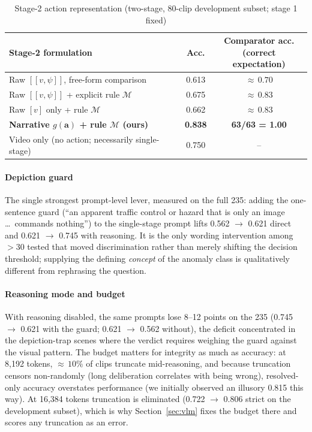 \documentclass[conference]{IEEEtran}
\newcommand{\act}{\boldsymbol{a}}          %
\newcommand{\Mcal}{\mathcal{M}}            %
\begin{document}
\begin{table}[htbp]
\caption{Stage-2 action representation (two-stage, 80-clip development subset; stage 1 fixed)}
\begin{center}
\footnotesize
\begin{tabular}{|p{3.05cm}|c|c|}
\hline
\textbf{Stage-2 formulation} & \textbf{Acc.} & \parbox[c]{3.05cm}{\centering\textbf{Comparator acc.}\\\textbf{(correct expectation)}\vspace{1pt}} \\
\hline
Raw $[[v, \psi]]$, free-form comparison & 0.613 & ${\approx}\,0.70$ \\
\hline
Raw $[[v, \psi]]$ + explicit rule $\Mcal$ & 0.675 & ${\approx}\,0.83$ \\
\hline
Raw $[v]$ only + rule $\Mcal$ & 0.662 & ${\approx}\,0.83$ \\
\hline
\textbf{Narrative $g(\act)$ + rule $\Mcal$ (ours)} & \textbf{0.838} & \textbf{63/63 = 1.00} \\
\hline
Video only (no action; necessarily single-stage) & 0.750 & -- \\
\hline
\end{tabular}
\label{tab:action}
\end{center}
\end{table}

\paragraph{Depiction guard} The single strongest prompt-level lever, measured on the full 235: adding the one-sentence guard (``an apparent traffic control or hazard that is only an image \dots\ commands nothing'') to the single-stage prompt lifts 0.562 $\rightarrow$ 0.621 direct and 0.621 $\rightarrow$ 0.745 with reasoning. It is the only wording intervention among $>30$ tested that moved discrimination rather than merely shifting the decision threshold; supplying the defining \emph{concept} of the anomaly class is qualitatively different from rephrasing the question.

\paragraph{Reasoning mode and budget} With reasoning disabled, the same prompts lose 8--12 points on the 235 (0.745 $\rightarrow$ 0.621 with the guard; 0.621 $\rightarrow$ 0.562 without), the deficit concentrated in the depiction-trap scenes where the verdict requires weighing the guard against the visual pattern. The budget matters for integrity as much as accuracy: at 8{,}192 tokens, ${\approx}\,10\%$ of clips truncate mid-reasoning, and because truncation censors non-randomly (long deliberation correlates with being wrong), resolved-only accuracy overstates performance (we initially observed an illusory 0.815 this way). At 16{,}384 tokens truncation is eliminated (0.722 $\rightarrow$ 0.806 strict on the development subset), which is why Section~\ref{sec:vlm} fixes the budget there and scores any truncation as an error.
\end{document}
